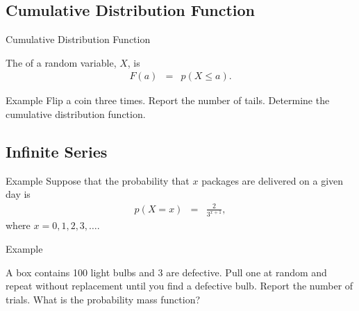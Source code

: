 \subsection{Cumulative Distribution Function}


\begin{frame}{Cumulative Distribution Function}

  \begin{definition}
    The  of a random
    variable, $X$, is
    \begin{eqnarray*}
      F(a) & = & p(X \leq a).
    \end{eqnarray*}
  \end{definition}
  
\end{frame}

\begin{frame}{Example}
  Flip a coin three times. Report the number of tails. Determine the
  cumulative distribution function.
\end{frame}

\subsection{Infinite Series}

\begin{frame}{Example}
  Suppose that the probability that $x$ packages are delivered on a
  given day is 
  \begin{eqnarray*}
    p(X=x) & = & \frac{2}{3^{x+1}},
  \end{eqnarray*}
  where $x=0,1,2,3,\ldots$.
\end{frame}

\begin{frame}{Example}

  A box contains 100 light bulbs and 3 are defective. Pull one at
  random and repeat without replacement until you find a defective
  bulb. Report the number of trials. What is the probability mass
  function?
  
\end{frame}



